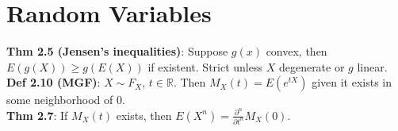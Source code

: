 \section{Random Variables}
\textbf{Thm 2.5 (Jensen's inequalities)}: Suppose $g(x)$ convex, then $E(g(X)) \geq g(E(X))$ if existent. Strict unless $X$ degenerate or $g$ linear.\\
\textbf{Def 2.10 (MGF)}: $X\sim F_X$, $t\in\mathbb{R}$. Then $M_X(t) = E(e^{tX})$ given it exists in some neighborhood of 0.\\
\textbf{Thm 2.7}: If $M_X(t)$ exists, then $E(X^n) = \frac{\partial^n}{\partial t^n}M_X(0)$. %
